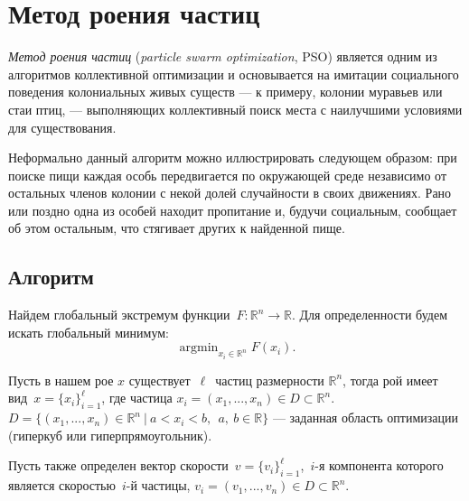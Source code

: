 \chapter{Метод роения частиц} \label{ParticleSwarmOptimisation}
\noindent
\emph{Метод роения частиц} (\emph{particle swarm optimization}, PSO) является одним из алгоритмов коллективной оптимизации и основывается на имитации социального поведения колониальных живых существ --- к примеру, колонии муравьев или стаи птиц, --- выполняющих коллективный поиск места с наилучшими условиями для существования.

Неформально данный алгоритм можно иллюстрировать следующем образом: при поиске пищи каждая особь передвигается по окружающей среде независимо от остальных членов колонии с некой долей случайности в своих движениях. Рано или поздно одна из особей находит пропитание и, будучи социальным, сообщает об этом остальным, что стягивает других к найденной пище.

\section{Алгоритм}
\noindent
Найдем глобальный экстремум функции~$F \colon \mathbb{R}^{n} \to \mathbb{R}$. Для определенности будем искать глобальный минимум:
\[
	\mathop{\mathrm{argmin}}_{x_i \in \mathbb{R}^{n}} F(x_i).
\]

Пусть в нашем рое $x$ существует~$\ell$~частиц размерности $\mathbb{R}^{n}$, тогда рой имеет вид~$x = \{x_i\}_{i = 1}^{\ell}$, где частица $x_i = (x_1, ..., x_n) \in D \subset \mathbb{R}^n$.
$D = \{(x_1, ..., x_n) \in \mathbb{R}^n \ | \  a < x_i < b,\ \ a,\ b \in \mathbb{R} \}$ --- заданная область оптимизации (гиперкуб или гиперпрямоугольник).

Пусть также определен вектор скорости~$v = \{v_i\}_{i=1}^{\ell}$,~$i$-я компонента которого является скоростью~$i$-й частицы, $v_i = (v_1, ..., v_n) \in D \subset \mathbb{R}^n$.

